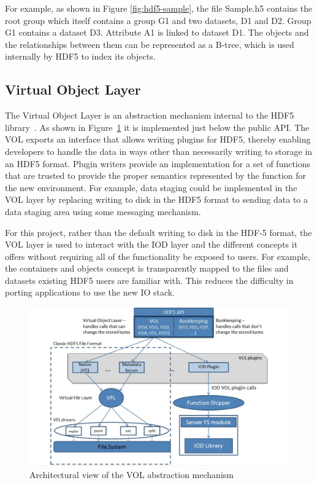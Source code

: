 \documentclass[conference]{IEEEtran}
\begin{document}
For example, as shown in Figure \ref{fig:hdf5-sample}, the file Sample.h5
contains the root group which itself contains a group G1 and two datasets, D1
and D2. Group G1 contains a dataset D3. Attribute A1 is linked to dataset D1.
The objects and the relationships between them can be represented as a B-tree,
which is used internally by HDF5 to index its objects.

\subsection{Virtual Object Layer}
\label{virtual-object-layer}

The Virtual Object Layer is an abstraction mechanism internal to the HDF5
library~\cite{hdf5}. As shown in Figure~\ref{fig:vol-arch} it is implemented
just below the public API. The VOL exports an interface that allows writing
plugins for HDF5, thereby enabling developers to handle the data in ways other
than necessarily writing to storage in an HDF5 format.  Plugin writers provide
an implementation for a set of functions that are trusted to provide the
proper semantics represented by the function for the new environment. For
example, data staging could be implemented in the VOL layer by replacing
writing to disk in the HDF5 format to sending data to a data staging area using
some messaging mechanism.

For this project, rather than the default writing to disk in the HDF-5 format,
the VOL layer is used to interact with the IOD layer and the different concepts
it offers without requiring all of the functionality be exposed to users. For
example, the containers and objects concept is transparently mapped to the
files and datasets existing HDF5 users are familiar with.  This reduces the
difficulty in porting applications to use the new IO stack.

\begin{figure}[htbp]
\centering
\includegraphics[width=\columnwidth]{images/vol-arch.png}
\caption{Architectural view of the VOL abstraction mechanism}
\label{fig:vol-arch}
\end{figure}
\end{document}
